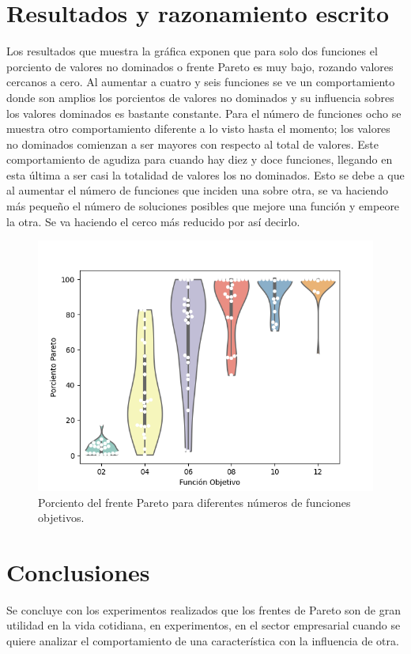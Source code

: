 \documentclass{article}
\begin{document}
\section{Resultados y razonamiento escrito}

Los resultados que muestra la gráfica exponen que para solo dos funciones el porciento de valores no dominados o frente Pareto es muy bajo, rozando valores cercanos a cero. Al aumentar a cuatro y seis funciones se ve un comportamiento donde son amplios los porcientos de valores no dominados y su influencia sobres los valores dominados es bastante constante. Para el número de funciones ocho se muestra otro comportamiento diferente a lo visto hasta el momento; los valores no dominados comienzan a ser mayores con respecto al total de valores. Este comportamiento de agudiza para cuando hay diez y doce funciones, llegando en esta última a ser casi la totalidad de valores los no dominados. Esto se debe a que al aumentar el número de funciones que inciden una sobre otra, se va haciendo más pequeño el número de soluciones posibles que mejore una función y empeore la otra. Se va haciendo el cerco más reducido por así decirlo.


\begin{figure}[H]
\centering
	\includegraphics[scale=0.8]{Figure_1.png}
	\caption{Porciento del frente Pareto para diferentes números de funciones objetivos.}
	\label{1}		
\end{figure}



\section{Conclusiones}
Se concluye con los experimentos realizados que los frentes de Pareto son de gran utilidad en la vida cotidiana, en experimentos, en el sector empresarial cuando se quiere analizar el comportamiento de una característica con la influencia de otra.



\end{document}

